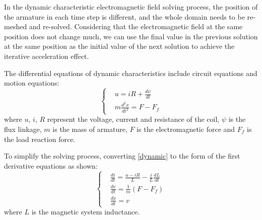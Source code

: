 \documentclass[journal,transmag]{IEEEtran}
\begin{document}
In the dynamic characteristic electromagnetic field solving process, the position of the armature in each time step is different, and the whole domain needs to be re-meshed and re-solved. Considering that the electromagnetic field at the same position does not change much, we can use the final value in the previous solution at the same position as the initial value of the next solution to achieve the iterative acceleration effect.

The differential equations of dynamic characteristics include circuit equations and motion equations:
\begin{equation}
\left\{ 
\begin{aligned}
&u = iR + \frac{{d\psi }}{{dt}}\\
&m\frac{{{d^2}x}}{{d{t^2}}} = F - {F_f}
\end{aligned} 
\right.
\label{dynamic}
\end{equation}
where $u$, $i$, $R$ represent the voltage, current and resistance of the coil, $\psi$ is the flux linkage, $m$ is the mass of armature, $F$ is the electromagnetic force and $F_f$ is the load reaction force.

To simplify the solving process, converting \eqref{dynamic} to the form of the first derivative equations as shown:
\begin{equation}
\left\{
\begin{aligned}
&\frac{{di}}{{dt}} = \frac{{u - iR}}{L} - \frac{i}{L}\frac{{dL}}{{dt}}\\
&\frac{{dv}}{{dt}} = \frac{1}{m}(F - {F_f})\\
&\frac{{dx}}{{dt}} = v
\end{aligned}
\right.
\end{equation}
where $L$ is the magnetic system inductance.
\end{document}
